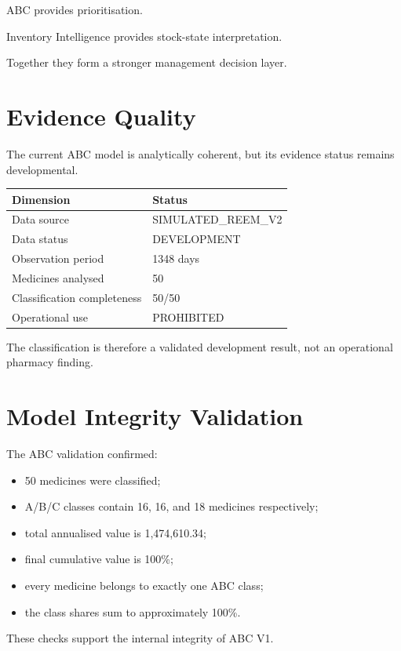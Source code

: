 \documentclass[12pt]{article}
\begin{document}
ABC provides prioritisation.

Inventory Intelligence provides stock-state interpretation.

Together they form a stronger management decision layer.

\section{Evidence Quality}

The current ABC model is analytically coherent, but its evidence status remains
developmental.

\begin{center}
\begin{tabular}{ll}
\toprule
Dimension & Status\\
\midrule
Data source & SIMULATED\_REEM\_V2\\
Data status & DEVELOPMENT\\
Observation period & 1348 days\\
Medicines analysed & 50\\
Classification completeness & 50/50\\
Operational use & PROHIBITED\\
\bottomrule
\end{tabular}
\end{center}

The classification is therefore a validated development result, not an
operational pharmacy finding.

\section{Model Integrity Validation}

The ABC validation confirmed:

\begin{itemize}
    \item 50 medicines were classified;
    \item A/B/C classes contain 16, 16, and 18 medicines respectively;
    \item total annualised value is 1,474,610.34;
    \item final cumulative value is 100\%;
    \item every medicine belongs to exactly one ABC class;
    \item the class shares sum to approximately 100\%.
\end{itemize}

These checks support the internal integrity of ABC V1.
\end{document}
